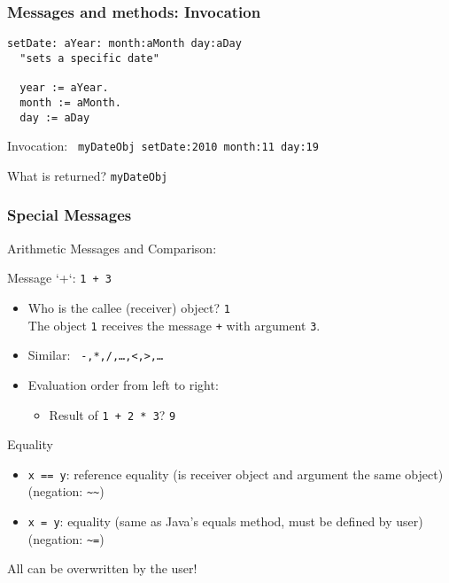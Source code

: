 \documentclass{beamer}
\newcommand{\Blue}[1]{\color{blue}#1\color{black}}
\begin{document}

\begin{frame}[fragile]
\frametitle{Messages and methods: Invocation}

\begin{example}
\begin{lstlisting}[language=Smalltalk]
setDate: aYear: month:aMonth day:aDay 
  "sets a specific date"

  year := aYear.
  month := aMonth.
  day := aDay
\end{lstlisting}
\end{example}

Invocation:
\lstinline[language=Smalltalk]+ myDateObj setDate:2010 month:11 day:19+

\pause\bigskip

What is returned? \pause \texttt{myDateObj}

\end{frame}


\begin{frame}[fragile]
\frametitle{Special Messages}


\Blue{Arithmetic Messages and Comparison}:

Message `+`: \texttt{1 + 3}

\begin{itemize}
\item Who is the callee (receiver) object? \pause \texttt{1}\\
  The object \texttt{1} receives the message \texttt{+} with argument \texttt{3}.
\item Similar: \texttt{ -,*,/,\ldots,<,>,\ldots}
\item Evaluation order from left to right:
  \begin{itemize}
    \item Result of \texttt{1 + 2 * 3}? \pause \alert{\texttt{9}}
  \end{itemize}
\end{itemize}

\Blue{Equality}

\begin{itemize}
\item \texttt{x == y}: reference equality (is receiver object and
  argument the same object) (negation: \verb+~~+)
\item \texttt{x = y}: equality (same as Java's equals method, must be
  defined by user) (negation: \verb+~=+)
\end{itemize}
\pause

All can be overwritten by the user!

\end{frame}
\end{document}
